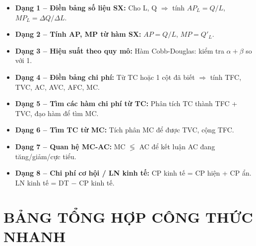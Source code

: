\documentclass[a4paper,11pt]{article}
\begin{document}
\begin{tip}
\begin{itemize}
  \item \textbf{Dạng 1 -- Điền bảng số liệu SX:} Cho L, Q $\Rightarrow$ tính $AP_L = Q/L$, $MP_L = \Delta Q / \Delta L$.
  \item \textbf{Dạng 2 -- Tính AP, MP từ hàm SX:} $AP = Q/L$, $MP = Q'_L$.
  \item \textbf{Dạng 3 -- Hiệu suất theo quy mô:} Hàm Cobb-Douglas: kiểm tra $\alpha + \beta$ so với 1.
  \item \textbf{Dạng 4 -- Điền bảng chi phí:} Từ TC hoặc 1 cột đã biết $\Rightarrow$ tính TFC, TVC, AC, AVC, AFC, MC.
  \item \textbf{Dạng 5 -- Tìm các hàm chi phí từ TC:} Phân tích TC thành TFC + TVC, đạo hàm để tìm MC.
  \item \textbf{Dạng 6 -- Tìm TC từ MC:} Tích phân MC để được TVC, cộng TFC.
  \item \textbf{Dạng 7 -- Quan hệ MC-AC:} MC $\lessgtr$ AC để kết luận AC đang tăng/giảm/cực tiểu.
  \item \textbf{Dạng 8 -- Chi phí cơ hội / LN kinh tế:} CP kinh tế = CP hiện + CP ẩn. LN kinh tế = DT $-$ CP kinh tế.
\end{itemize}
\end{tip}

\newpage
\section{BẢNG TỔNG HỢP CÔNG THỨC NHANH}
\end{document}
